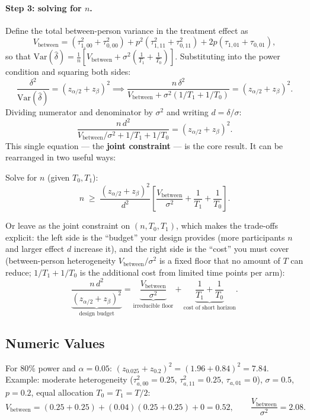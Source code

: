 \documentclass{article}
\begin{document}
\paragraph{Step 3: solving for $n$.}
Define the total between-person variance in the treatment effect as
\[
    V_{\mathrm{between}}
    = (\tau^2_{1,00} + \tau^2_{0,00})
      + p^2(\tau^2_{1,11} + \tau^2_{0,11})
      + 2p(\tau_{1,01} + \tau_{0,01}),
\]
so that $\mathrm{Var}(\hat{\delta}) = \frac{1}{n}\!\left[V_{\mathrm{between}} +
\sigma^2\!\left(\frac{1}{T_1}+\frac{1}{T_0}\right)\right]$.
Substituting into the power condition and squaring both sides:
\[
    \frac{\delta^2}{\mathrm{Var}(\hat{\delta})} = (z_{\alpha/2} + z_\beta)^2
    \implies
    \frac{n\,\delta^2}{V_{\mathrm{between}} + \sigma^2(1/T_1 + 1/T_0)}
    = (z_{\alpha/2} + z_\beta)^2.
\]
Dividing numerator and denominator by $\sigma^2$ and writing $d = \delta/\sigma$:
\[
    \frac{n\,d^2}{V_{\mathrm{between}}/\sigma^2 + 1/T_1 + 1/T_0}
    = (z_{\alpha/2} + z_\beta)^2.
\]
This single equation — the \textbf{joint constraint} — is the core result.
It can be rearranged in two useful ways:

\medskip
\noindent Solve for $n$ (given $T_0, T_1$):
\[
    \boxed{n \;\geq\;
    \frac{(z_{\alpha/2} + z_\beta)^2}{d^2}
    \left[\frac{V_{\mathrm{between}}}{\sigma^2} + \frac{1}{T_1} + \frac{1}{T_0}\right].}
\]

\noindent Or leave as the joint constraint on $(n, T_0, T_1)$, which makes the trade-offs explicit:
the left side is the ``budget'' your design provides (more participants $n$ and larger effect $d$
increase it), and the right side is the ``cost'' you must cover (between-person heterogeneity
$V_{\mathrm{between}}/\sigma^2$ is a fixed floor that no amount of $T$ can reduce;
$1/T_1 + 1/T_0$ is the additional cost from limited time points per arm):
\[
    \underbrace{\frac{n\,d^2}{(z_{\alpha/2}+z_\beta)^2}}_{\text{design budget}}
    =
    \underbrace{\frac{V_{\mathrm{between}}}{\sigma^2}}_{\text{irreducible floor}}
    +
    \underbrace{\frac{1}{T_1} + \frac{1}{T_0}}_{\text{cost of short horizon}}.
\]

\subsection{Numeric Values}

For 80\% power and $\alpha = 0.05$: $(z_{0.025} + z_{0.2})^2 = (1.96 + 0.84)^2 = 7.84$.
Example: moderate heterogeneity ($\tau^2_{a,00} = 0.25$, $\tau^2_{a,11} = 0.25$,
$\tau_{a,01} = 0$), $\sigma = 0.5$, $p = 0.2$, equal allocation $T_0 = T_1 = T/2$:
\[
    V_{\mathrm{between}} = (0.25 + 0.25) + (0.04)(0.25 + 0.25) + 0 = 0.52,
    \qquad
    \frac{V_{\mathrm{between}}}{\sigma^2} = 2.08.
\]
\end{document}
